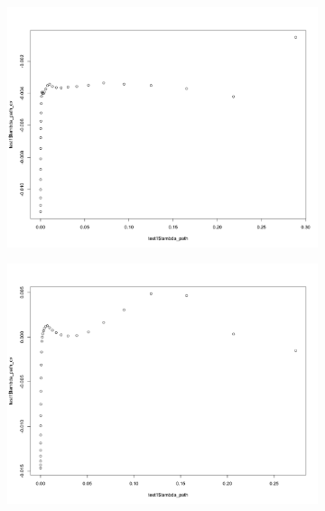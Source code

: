 \documentclass[letterpaper]{article}
\begin{document}
\begin{figure}[H]
\centering
\begin{subfigure}{0.5\textwidth}
  \centering
  \includegraphics[width=1\linewidth]{./result_plot/correct/7_path_plot}
\end{subfigure}%
\begin{subfigure}{.5\textwidth}
  \centering
  \includegraphics[width=1\linewidth]{./result_plot/correct/8_path_plot}
\end{subfigure}

\end{figure}
\end{document}
